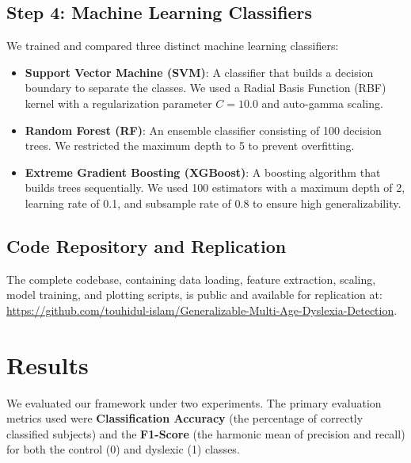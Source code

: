 \documentclass[journal]{IEEEtran}
\begin{document}
\subsection{Step 4: Machine Learning Classifiers}
We trained and compared three distinct machine learning classifiers:
\begin{itemize}
    \item \textbf{Support Vector Machine (SVM)}: A classifier that builds a decision boundary to separate the classes. We used a Radial Basis Function (RBF) kernel with a regularization parameter $C=10.0$ and auto-gamma scaling.
    \item \textbf{Random Forest (RF)}: An ensemble classifier consisting of 100 decision trees. We restricted the maximum depth to 5 to prevent overfitting.
    \item \textbf{Extreme Gradient Boosting (XGBoost)}: A boosting algorithm that builds trees sequentially. We used 100 estimators with a maximum depth of 2, learning rate of 0.1, and subsample rate of 0.8 to ensure high generalizability.
\end{itemize}

\subsection{Code Repository and Replication}
The complete codebase, containing data loading, feature extraction, scaling, model training, and plotting scripts, is public and available for replication at: \href{https://github.com/touhidul-islam/Generalizable-Multi-Age-Dyslexia-Detection}{https://github.com/touhidul-islam/Generalizable-Multi-Age-Dyslexia-Detection}.

\section{Results}
We evaluated our framework under two experiments. The primary evaluation metrics used were \textbf{Classification Accuracy} (the percentage of correctly classified subjects) and the \textbf{F1-Score} (the harmonic mean of precision and recall) for both the control (0) and dyslexic (1) classes.
\end{document}
